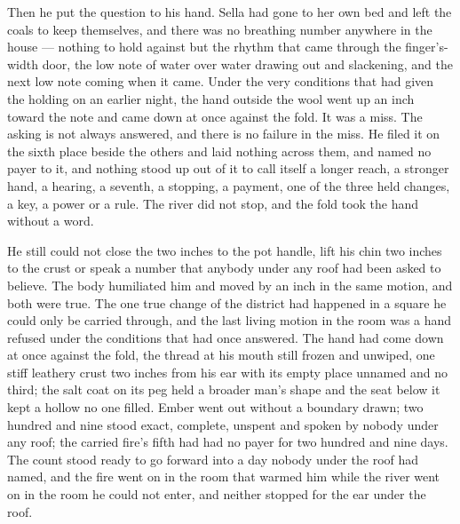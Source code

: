 Then he put the question to his hand. Sella had gone to her own bed and left the coals to keep themselves, and there was no breathing number anywhere in the house --- nothing to hold against but the rhythm that came through the finger's-width door, the low note of water over water drawing out and slackening, and the next low note coming when it came. Under the very conditions that had given the holding on an earlier night, the hand outside the wool went up an inch toward the note and came down at once against the fold. It was a miss. The asking is not always answered, and there is no failure in the miss. He filed it on the sixth place beside the others and laid nothing across them, and named no payer to it, and nothing stood up out of it to call itself a longer reach, a stronger hand, a hearing, a seventh, a stopping, a payment, one of the three held changes, a key, a power or a rule. The river did not stop, and the fold took the hand without a word.

He still could not close the two inches to the pot handle, lift his chin two inches to the crust or speak a number that anybody under any roof had been asked to believe. The body humiliated him and moved by an inch in the same motion, and both were true. The one true change of the district had happened in a square he could only be carried through, and the last living motion in the room was a hand refused under the conditions that had once answered. The hand had come down at once against the fold, the thread at his mouth still frozen and unwiped, one stiff leathery crust two inches from his ear with its empty place unnamed and no third; the salt coat on its peg held a broader man's shape and the seat below it kept a hollow no one filled. Ember went out without a boundary drawn; two hundred and nine stood exact, complete, unspent and spoken by nobody under any roof; the carried fire's fifth had had no payer for two hundred and nine days. The count stood ready to go forward into a day nobody under the roof had named, and the fire went on in the room that warmed him while the river went on in the room he could not enter, and neither stopped for the ear under the roof.
